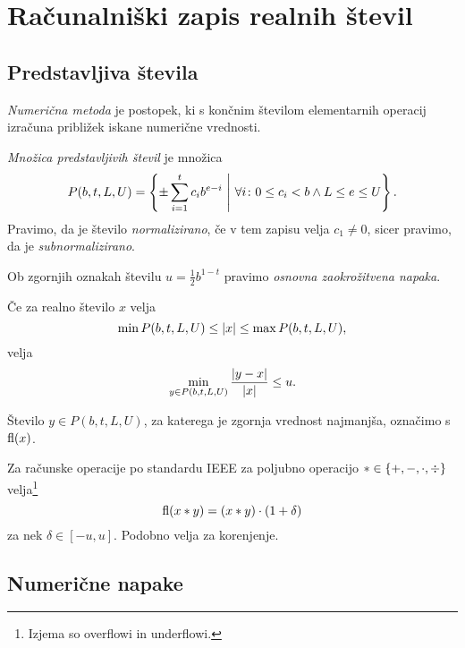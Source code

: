 \section{Računalniški zapis realnih števil}

\subsection{Predstavljiva števila}

\begin{definicija}
\emph{Numerična metoda} je postopek, ki s
končnim številom elementarnih operacij izračuna približek iskane
numerične vrednosti.
\end{definicija}

\begin{definicija}
\emph{Množica predstavljivih števil}
je množica
\[
P(b, t, L, U) =
\left\{\pm \sum_{i=1}^t c_i b^{e-i}~\middle\vert~
\forall i \colon 0 \leq c_i < b \land L \leq e \leq U\right\}.
\]
Pravimo, da je število
\emph{normalizirano}, če v tem zapisu
velja $c_1 \ne 0$, sicer pravimo, da je \emph{subnormalizirano}.
\end{definicija}

\begin{definicija}
Ob zgornjih oznakah številu $u = \frac{1}{2} b^{1-t}$ pravimo
\emph{osnovna zaokrožitvena napaka}.
\end{definicija}

\begin{izrek}
Če za realno število $x$ velja
\[
\min P(b, t, L, U) \leq \left\lvert x\right\rvert \leq \max P(b, t, L, U),
\]
velja
\[
\min_{y \in P(b, t, L, U)} \frac{\left\lvert y-x\right\rvert}{\left\lvert x\right\rvert} \leq u.
\]
\end{izrek}

\begin{definicija}
Število $y \in P(b, t, L, U)$, za katerega je zgornja vrednost
najmanjša, označimo s $\operatorname{fl}(x)$.
\end{definicija}

\begin{opomba}
Za računske operacije po standardu IEEE za poljubno operacijo
$* \in \left\{+, -, \cdot, \div\right\}$ velja\footnote{Izjema so overflowi
in underflowi.}
\[
\operatorname{fl}(x*y) = (x*y) \cdot(1 + \delta)
\]
za nek $\delta \in [-u,u]$. Podobno velja za korenjenje.
\end{opomba}

\newpage

\subsection{Numerične napake}

